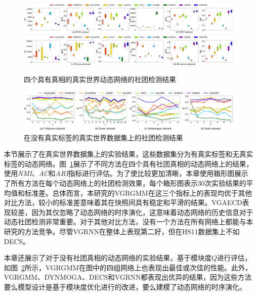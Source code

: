 \begin{figure}[htbp]
    \centering

    \includegraphics[width=1\textwidth]{figures/chap06/chap5realDataGHS-box.pdf}
    \includegraphics[width=1\textwidth]{figures/chap06/chap5realDataGpw-box.pdf}
    \caption{四个具有真相的真实世界动态网络的社团检测结果}
    \label{fig:realnet}
    \vspace{0cm}
\end{figure}

\begin{figure}[htbp]
    \centering
    \includegraphics[width=1\textwidth]{figures/chap06/chap5realDataNG.pdf}
    \caption{在没有真实标签的真实世界数据集上的社团检测结果}
    \label{fig:noTruth}
    \vspace{0cm}
\end{figure}

本节展示了在真实世界数据集上的实验结果，这些数据集分为有真实标签和无真实标签的动态网络。图~\ref{fig:realnet}展示了不同方法在四个具有社团真相的动态网络上的结果，使用\emph{NMI}、\emph{AC}和\emph{ARI}指标进行评估。为了使比较更加清晰，本章使用箱形图展示了所有方法在每个动态网络上的社团检测效果，每个箱形图表示$30$次实验结果的平均值和标准差。总体而言，本研究的VGRGMM在这三个指标上的表现均优于其他对比方法，较小的标准差意味着其在快照间具有稳定和平滑的结果。VGAECD表现较差，因为其仅忽略了动态网络的时序演化，这意味着动态网络的历史信息对于动态社团检测非常重要。对于其他对比方法，没有一个方法在所有网络上都能与本研究的方法竞争。尽管VGRNN在整体上表现第二好，但在HS11数据集上不如DECS。

本章还展示了对于没有社团真相的动态网络的实验结果，基于模块度$Q$进行评估，如图~\ref{fig:noTruth}所示，VGRGMM在图中的四组网络上也表现出最佳或次佳的性能。此外，VGRGMM、DYNMOGA、DECS和VGRNN都表现出优异的结果，因为这些方法要么模型设计是基于模块度优化进行的改进，要么建模了动态网络的时序演化。

